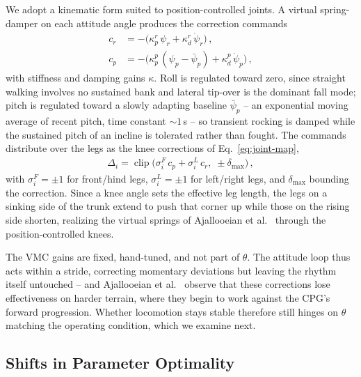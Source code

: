 \documentclass[letterpaper, 10 pt, conference]{ieeeconf}  %
\begin{document}
We adopt a kinematic form suited to position-controlled joints.
A virtual spring-damper on each attitude angle produces the correction commands
\begin{align}
  c_r &= -\big( \kappa^{r}_{p}\, \psi_r + \kappa^{r}_{d}\, \dot{\psi}_r \big) \,, \label{eq:vmc-roll} \\
  c_p &= -\big( \kappa^{p}_{p}\, (\psi_p - \bar{\psi}_p) + \kappa^{p}_{d}\, \dot{\psi}_p \big) \,, \label{eq:vmc-pitch}
\end{align}
with stiffness and damping gains $\kappa$.
Roll is regulated toward zero, since straight walking involves no sustained bank and lateral tip-over is the dominant fall mode; pitch is regulated toward a slowly adapting baseline $\bar{\psi}_p$ -- an exponential moving average of recent pitch, time constant $\sim\!1$\,s -- so transient rocking is damped while the sustained pitch of an incline is tolerated rather than fought.
The commands distribute over the legs as the knee corrections of Eq.~\ref{eq:joint-map},
\begin{align}
  \Delta_i = \operatorname{clip}\big( \sigma^{F}_i\, c_p + \sigma^{L}_i\, c_r ,\; \pm \delta_{\max} \big) \,,
  \label{eq:vmc-distribution}
\end{align}
with $\sigma^{F}_i = \pm 1$ for front/hind legs, $\sigma^{L}_i = \pm 1$ for left/right legs, and $\delta_{\max}$ bounding the correction.
Since a knee angle sets the effective leg length, the legs on a sinking side of the trunk extend to push that corner up while those on the rising side shorten, realizing the virtual springs of Ajallooeian et al.~\cite{ajallooeian2013central} through the position-controlled knees.

The VMC gains are fixed, hand-tuned, and not part of $\theta$.
The attitude loop thus acts within a stride, correcting momentary deviations but leaving the rhythm itself untouched -- and Ajallooeian et al.~\cite{ajallooeian2013central} observe that these corrections lose effectiveness on harder terrain, where they begin to work against the CPG's forward progression.
Whether locomotion stays stable therefore still hinges on $\theta$ matching the operating condition, which we examine next.

\subsection{Shifts in Parameter Optimality}
\label{sec:optimality-shift}
\end{document}
